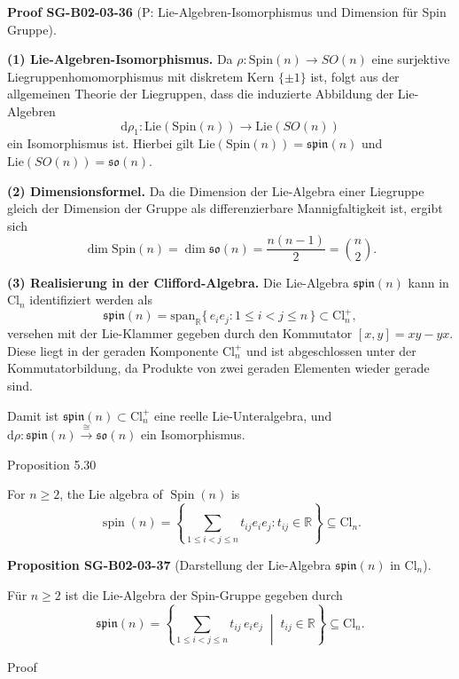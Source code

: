 \documentclass[10pt, letterpaper]{article}
\newcommand{\R}{\mathbb{R}}
\newcommand{\Cl}{\mathrm{Cl}}
\newcommand{\Spin}{\mathrm{Spin}}
\newcommand{\CustomHeading}[3]{%
  \par\medskip\noindent%
  \textbf{#1 #2} \textnormal{(#3)}.\enskip%
}
\newenvironment{PROP}[2]{\begin{unitbox}\CustomHeading{Proposition}{#1}{#2}}{\end{unitbox}}
\newenvironment{PROOF}[2]{\begin{unitbox}\CustomHeading{Proof}{#1}{#2}}{\end{unitbox}}
\begin{document}
\begin{PROOF}{SG-B02-03-36}{P: Lie-Algebren-Isomorphismus und Dimension für Spin Gruppe}
\textbf{(1) Lie-Algebren-Isomorphismus.}
Da \(\rho:\Spin(n)\to SO(n)\) eine surjektive Liegruppenhomomorphismus mit
diskretem Kern \(\{\pm1\}\) ist, folgt aus der allgemeinen Theorie der
Liegruppen, dass die induzierte Abbildung der Lie-Algebren
\[
\mathrm{d}\rho_1:\mathrm{Lie}(\Spin(n))\to\mathrm{Lie}(SO(n))
\]
ein Isomorphismus ist. 
Hierbei gilt \(\mathrm{Lie}(\Spin(n))=\mathfrak{spin}(n)\) und 
\(\mathrm{Lie}(SO(n))=\mathfrak{so}(n)\).

\smallskip
\textbf{(2) Dimensionsformel.}
Da die Dimension der Lie-Algebra einer Liegruppe gleich der Dimension der Gruppe
als differenzierbare Mannigfaltigkeit ist, ergibt sich
\[
\dim\Spin(n)=\dim\mathfrak{so}(n)=\frac{n(n-1)}{2}=\binom{n}{2}.
\]

\smallskip
\textbf{(3) Realisierung in der Clifford-Algebra.}
Die Lie-Algebra \(\mathfrak{spin}(n)\) kann in \(\Cl_n\) identifiziert werden als
\[
\mathfrak{spin}(n)=\mathrm{span}_{\R}\{\,e_i e_j : 1\le i<j\le n\,\}
\subset \Cl_n^{+},
\]
versehen mit der Lie-Klammer gegeben durch den Kommutator
\([x,y]=xy-yx\).
Diese liegt in der geraden Komponente \(\Cl_n^{+}\) und ist abgeschlossen
unter der Kommutatorbildung, da Produkte von zwei geraden Elementen wieder gerade sind.

Damit ist \(\mathfrak{spin}(n)\subset\Cl_n^{+}\) eine reelle Lie-Unteralgebra,
und \(\mathrm{d}\rho:\mathfrak{spin}(n)\xrightarrow{\cong}\mathfrak{so}(n)\) 
ein Isomorphismus.
\end{PROOF}




Proposition 5.30


For $n \geq 2$, the Lie algebra of $\operatorname{Spin}(n)$ is
$$
\operatorname{spin}(n)=\left\{\sum_{1 \leqslant i<j \leqslant n} t_{i j} e_{i} e_{j}: t_{i j} \in \mathbb{R}\right\} \subseteq \mathrm{Cl}_{n} .
$$



\begin{PROP}{SG-B02-03-37}{Darstellung der Lie-Algebra \(\mathfrak{spin}(n)\) in \(\Cl_n\)}
Für \(n\ge2\) ist die Lie-Algebra der Spin-Gruppe gegeben durch
\[
\mathfrak{spin}(n)
=\left\{
\sum_{1\le i<j\le n} t_{ij}\, e_i e_j
\;\middle|\;
t_{ij}\in\R
\right\}
\subseteq \Cl_n.
\]
\end{PROP}



Proof
\end{document}
